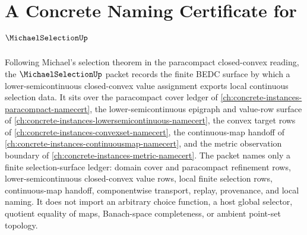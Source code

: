 \chapter{A Concrete Naming Certificate for $\MichaelSelectionUp$}
\label{ch:concrete-instances-michael-selection-namecert}

Following Michael's selection theorem in the paracompact closed-convex reading, the $\MichaelSelectionUp$ packet records the finite BEDC surface by which a lower-semicontinuous closed-convex value assignment exports local continuous selection data. It sits over the paracompact cover ledger of \autoref{ch:concrete-instances-paracompact-namecert}, the lower-semicontinuous epigraph and value-row surface of \autoref{ch:concrete-instances-lowersemicontinuous-namecert}, the convex target rows of \autoref{ch:concrete-instances-convexset-namecert}, the continuous-map handoff of \autoref{ch:concrete-instances-continuousmap-namecert}, and the metric observation boundary of \autoref{ch:concrete-instances-metric-namecert}. The packet names only a finite selection-surface ledger: domain cover and paracompact refinement rows, lower-semicontinuous closed-convex value rows, local finite selection rows, continuous-map handoff, componentwise transport, replay, provenance, and local naming. It does not import an arbitrary choice function, a host global selector, quotient equality of maps, Banach-space completeness, or ambient point-set topology.

